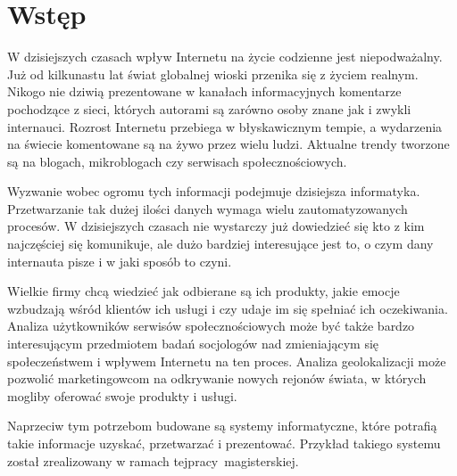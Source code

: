 \chapter{Wstęp}

\begin{comment}
- motywacja, po co to robimy
- state of the art. Jak wyglada dziedzina, ktora sie zajmujemy?
Stosujemy tu metode szybkiego top down z ogolnikow do szczegolow.
Przechodzimy do tematyki, ktora sie zajmujemy. Piszemy co zrobiono precyzyjnie
w danej tematyce. Cytujemy artykuly (ksiazki - won!) Piszemy to w celu ..
- .. zdefiniowania celow pracy
- a potem jak te cele chcemy osiagnac, jakimi metodami
- potem piszemy co bedzie znajdowac sie w kazdym z rodzialow
- i na koncu jaki jest impact pracy
\end{comment}

W dzisiejszych czasach wpływ Internetu na życie codzienne jest niepodważalny.
Już od kilkunastu lat świat globalnej wioski przenika się z życiem realnym.
Nikogo nie dziwią prezentowane w kanałach informacyjnych komentarze
pochodzące z sieci, których autorami są zarówno osoby znane jak i zwykli
internauci. Rozrost Internetu przebiega w błyskawicznym tempie, a wydarzenia na
świecie komentowane są na żywo przez wielu ludzi. Aktualne trendy tworzone są na
blogach, mikroblogach czy serwisach społecznościowych.

Wyzwanie wobec ogromu tych informacji podejmuje dzisiejsza informatyka.
Przetwarzanie tak dużej ilości danych wymaga wielu zautomatyzowanych procesów.
W dzisiejszych czasach nie wystarczy już dowiedzieć się kto z kim najczęściej
się komunikuje, ale dużo bardziej interesujące jest to, o czym dany internauta
pisze i w jaki sposób to czyni.

Wielkie firmy chcą wiedzieć jak odbierane są ich produkty, jakie emocje
wzbudzają wśród klientów ich usługi i czy udaje im się spełniać ich oczekiwania.
Analiza użytkowników serwisów społecznościowych może być także bardzo
interesującym przedmiotem badań socjologów nad zmieniającym się społeczeństwem i
wpływem Internetu na ten proces. Analiza geolokalizacji może pozwolić
marketingowcom na odkrywanie nowych rejonów świata, w których mogliby oferować swoje
produkty i usługi.

Naprzeciw tym potrzebom budowane są systemy informatyczne, które potrafią takie
informacje uzyskać, przetwarzać i prezentować. Przykład takiego systemu został
zrealizowany w ramach tej\linebreak pracy~magisterskiej.

